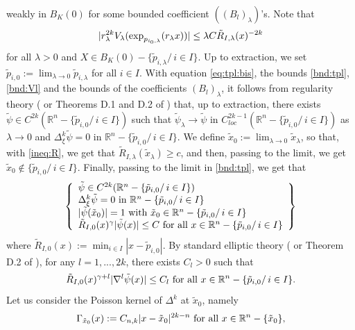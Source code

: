\documentclass[reqno]{amsart}
\def \rn {\mathbb{R}^n}
\def \tpl {\tilde{\psi}_\lambda}
\begin{document}
weakly in $B_{K}(0)$ for some bounded coefficient $((B_l)_\lambda)$'s. Note that
\begin{equation}\label{bnd:Vl}
|r_\lambda^{2k}V_\lambda(\hbox{exp}_{p_{i_0,\lambda}}(r_\lambda x))|\leq \lambda C \tilde{R}_{I,\lambda}(x)^{-2k}
\end{equation}
for all $\lambda>0$ and $X\in B_K(0)-\{\tilde{p}_{i,\lambda}/\, i\in I\}$. Up to extraction, we set $\tilde{p}_{i,0}:=\lim_{\lambda\to 0} \tilde{p}_{i,\lambda}$ for all $i\in I$. With equation \eqref{eq:tpl:bis}, the bounds \eqref{bnd:tpl}, \eqref{bnd:Vl} and the bounds of the coefficients $(B_l)_\lambda$, it follows from regularity theory (\cite{ADN} or Theorems D.1 and D.2 of \cite{robert:gjms}) that, up to extraction, there exists $\tilde{\psi}\in C^{2k}(\rn-\{\tilde{p}_{i,0}/\, i\in I\})$ such that $\tpl\to \tilde{\psi}$ in $C^{2k-1}_{loc}(\rn-\{\tilde{p}_{i,0}/\, i\in I\})$ as $\lambda\to 0$ and $ \Delta^k_\xi\tilde{\psi}=0$ in $\rn-\{\tilde{p}_{i,0}/\, i\in I\}$. We define $\tilde{x}_0:=\lim_{\lambda\to 0}\tilde{x}_\lambda$, so that, with \eqref{ineq:R}, we get that  $\tilde{R}_{I,\lambda}(\tilde{x}_\lambda)\geq c$, and then, passing to the limit, we get $\tilde{x}_0\not\in \{\tilde{p}_{i,0}/\, i\in I\}$. Finally, passing to the limit in \eqref{bnd:tpl}, we get that
 \begin{equation}\label{eq:psi}
\left\{\begin{array}{l}
\tilde{\psi}\in C^{2k}(\rn-\{\tilde{p}_{i,0}/\, i\in I\})\\
\Delta^k_\xi\tilde{\psi}=0 \hbox{  in }\rn-\{\tilde{p}_{i,0}/\, i\in I\}\\
|\tilde{\psi}(\tilde{x}_0)|=1\hbox{ with }\tilde{x}_0\in\rn- \{\tilde{p}_{i,0}/\, i\in I\}\\
\tilde{R}_{I,0}(x)^\gamma|\tilde{\psi}(x)|\leq C\hbox{ for all }x\in \rn-\{\tilde{p}_{i,0}/\, i\in I\}
\end{array}\right\}
\end{equation} 
where $\tilde{R}_{I,0}(x):=\min_{i\in I}|x-\tilde{p}_{i,0}|$. By standard elliptic theory (\cite{ADN} or Theorem D.2 of \cite{robert:gjms}), for any $l=1,...,2k$, there exists $C_l>0$ such that
\begin{equation*} 
\tilde{R}_{I,0}(x)^{\gamma+l}|\nabla^l\tilde{\psi}(x)|\leq C_l  \hbox{ for all }x\in \rn- \{\tilde{p}_{i,0}/\, i\in I\}.
\end{equation*}
 Let us consider the Poisson kernel of $\Delta^k$ at $\tilde{x}_0$, namely
\begin{equation}\label{def:gamma}
\Gamma_{\tilde{x}_0}(x):=C_{n,k}|x-\tilde{x}_0|^{2k-n}\hbox{ for all }x\in \rn-\{\tilde{x}_0\},
\end{equation}
\end{document}
